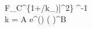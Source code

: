 F_C^{\{1+\left[\log_{10}(k_0[\mbox{\footnotesize M}]/k_{\infty})\right]^2\} ^{-1}} \\
k = A  e^{()} \left(  \right)^{B} 
